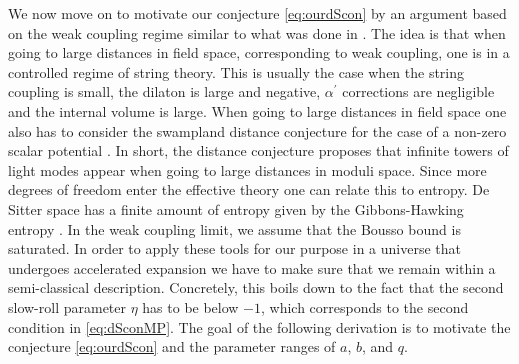 \documentclass[a4paper,12pt,twoside,openright]{report}
\begin{document}
We now move on to motivate our conjecture \eqref{eq:ourdScon} by an argument based on the weak coupling regime similar to what was done in \cite{Ooguri:2018wrx}. The idea is that when going to large distances in field space, corresponding to weak coupling, one is in a controlled regime of string theory. This is usually the case when the string coupling is small, the dilaton is large and negative, $\alpha^ \prime$ corrections are negligible and the internal volume is large. When going to large distances in field space one also has to consider the swampland distance conjecture \cite{Baume:2016psm} for the case of a non-zero scalar potential \cite{Klaewer:2016kiy,Ooguri:2006in}. In short, the distance conjecture proposes that infinite towers of light modes appear when going to large distances in moduli space. Since more degrees of freedom enter the effective theory one can relate this to entropy. De Sitter space has a finite amount of entropy given by the Gibbons-Hawking entropy \cite{Gibbons:1977mu}. In the weak coupling limit, we assume that the Bousso bound \cite{Bousso:1999xy} is saturated. In order to apply these tools for our purpose in a universe that undergoes accelerated expansion we have to make sure that we remain within a semi-classical description. Concretely, this boils down to the fact that the second slow-roll parameter $\eta$ has to be below $-1$, which corresponds to the second condition in \eqref{eq:dSconMP}. The goal of the following derivation is to motivate the conjecture \eqref{eq:ourdScon} and the parameter ranges of $a$, $b$, and $q$.
\end{document}
